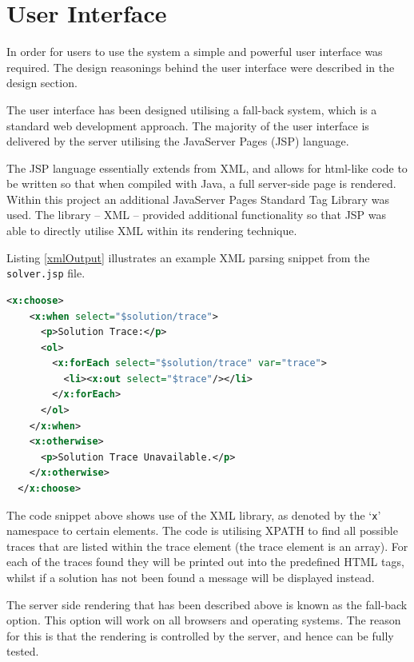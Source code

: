 \section{User Interface}
\label{sec:imp_user_interface}

In order for users to use the system a simple and powerful user interface was 
required. The design reasonings behind the user interface were described in 
the design section.

The user interface has been designed utilising a fall-back system, which is a 
standard web development approach. The majority of the user interface is 
delivered by the server utilising the JavaServer Pages (JSP) language.

The JSP language essentially extends from XML, and allows for html-like code to 
be written so that when compiled with Java, a full server-side page is rendered.
Within this project an additional JavaServer Pages Standard Tag Library was 
used. The library -- XML -- provided additional functionality so that JSP was 
able to directly utilise XML within its rendering technique.

Listing \ref{xmlOutput} illustrates an example XML parsing snippet from the 
\texttt{solver.jsp} file.

\begin{lstlisting}[language=XML, 
                   caption={isPatternValid deduces if a given solution pattern 
                            is valid}, 
                   label=xmlOutput] 
  <x:choose>
    <x:when select="$solution/trace">
      <p>Solution Trace:</p>
      <ol>
        <x:forEach select="$solution/trace" var="trace">
          <li><x:out select="$trace"/></li>
        </x:forEach>
      </ol>
    </x:when>
    <x:otherwise>
      <p>Solution Trace Unavailable.</p>
    </x:otherwise>
  </x:choose>
\end{lstlisting}

The code snippet above shows use of the XML library, as denoted by the
`\texttt{x}' namespace to certain elements. The code is utilising XPATH to find
all possible traces that are listed within the trace element (the trace element
is an array). For each of the traces found they will be printed out into the
predefined HTML tags, whilst if a solution has not been found a message will be
displayed instead.

The server side rendering that has been described above is known as the 
fall-back option. This option will work on all browsers and operating systems. 
The reason for this is that the rendering is controlled by the server, and hence
can be fully tested.

